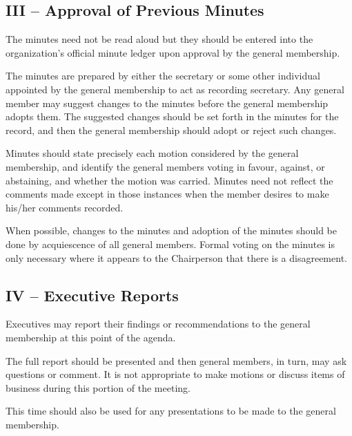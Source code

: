 \documentclass[12pt,a4paper]{article}
\begin{document}
\subsection*{III – Approval of Previous Minutes}

\begin{constitutionlist}
\item The minutes need not be read aloud but they should be entered into the organization's official minute ledger upon approval by the general membership.

\item The minutes are prepared by either the secretary or some other individual appointed by the general membership to act as recording secretary. Any general member may suggest changes to the minutes before the general membership adopts them. The suggested changes should be set forth in the minutes for the record, and then the general membership should adopt or reject such changes.

\item Minutes should state precisely each motion considered by the general membership, and identify the general members voting in favour, against, or abstaining, and whether the motion was carried. Minutes need not reflect the comments made except in those instances when the member desires to make his/her comments recorded.

\item When possible, changes to the minutes and adoption of the minutes should be done by acquiescence of all general members. Formal voting on the minutes is only necessary where it appears to the Chairperson that there is a disagreement.
\end{constitutionlist}

\subsection*{IV – Executive Reports}

\begin{constitutionlist}
\item Executives may report their findings or recommendations to the general membership at this point of the agenda.

\item The full report should be presented and then general members, in turn, may ask questions or comment. It is not appropriate to make motions or discuss items of business during this portion of the meeting.

\item This time should also be used for any presentations to be made to the general membership.
\end{constitutionlist}
\end{document}
